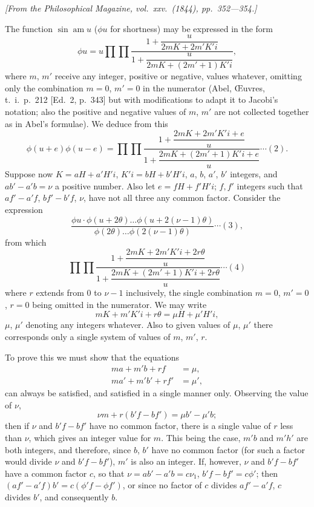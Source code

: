 \documentclass[12pt,a4paper]{article}
\begin{document}
\textit{[From the Philosophical Magazine, vol.~xxv.~(1844), pp.~352---354.]}

\bigskip
\setcounter{page}{120}

The function $\sin \operatorname{am} u$ ($\phi u$ for shortness) may be expressed in the form
\[
\phi u = u \prod \prod \frac{1 + \dfrac{u}{2mK + 2m'K'i}}{1 + \dfrac{u}{2mK + (2m'+1)K'i}},
\]
where $m$, $m'$ receive any integer, positive or negative, values whatever, omitting only
the combination $m = 0$, $m' = 0$ in the numerator (Abel, \OE uvres, t.~i.\ p.~212 [Ed.~2,
p.~343] but with modifications to adapt it to Jacobi's notation; also the positive and
negative values of $m$, $m'$ are not collected together as in Abel's formulae). We deduce
from this
\[
\phi(u+e)\phi(u-e) = \prod \prod \frac{1 + \dfrac{2mK + 2m'K'i + e}{u}}{1 + \dfrac{2mK + (2m'+1)K'i + e}{u}} \cdots (2).
\]
Suppose now $K = aH + a'H'i$, $K'i = bH + b'H'i$, $a$, $b$, $a'$, $b'$ integers, and $ab' - a'b = \nu$
a positive number. Also let $e = fH + f'H'i$; $f, f'$ integers such that $af' - a'f$, $bf' - b'f$, $\nu$,
have not all three any common factor. Consider the expression
\[
\frac{\phi u \cdot \phi(u + 2\theta) \ldots \phi(u + 2(\nu-1)\theta)}{\phi(2\theta) \ldots \phi(2(\nu-1)\theta)} \cdots (3),
\]
from which
\[
\prod \prod \frac{1 + \dfrac{2mK + 2m'K'i + 2r\theta}{u}}{1 + \dfrac{2mK + (2m'+1)K'i + 2r\theta}{u}} \cdots (4)
\]
where $r$ extends from $0$ to $\nu-1$ inclusively, the single combination $m = 0$, $m' = 0$, $r = 0$
being omitted in the numerator. We may write
\[
mK + m'K'i + r\theta = \mu H + \mu'H'i,
\]
$\mu$, $\mu'$ denoting any integers whatever. Also to given values of $\mu$, $\mu'$ there corresponds
only a single system of values of $m$, $m'$, $r$.

\newpage
\setcounter{page}{121}

To prove this we must show that the equations
\begin{align*}
ma + m'b + rf &= \mu,\\
ma' + m'b' + rf' &= \mu',
\end{align*}
can always be satisfied, and satisfied in a single manner only. Observing the value of $\nu$,
\[
\nu m + r(b'f - bf') = \mu b' - \mu'b;
\]
then if $\nu$ and $b'f - bf'$ have no common factor, there is a single value of $r$ less than $\nu$,
which gives an integer value for $m$. This being the case, $m'b$ and $m'h'$ are both
integers, and therefore, since $b$, $b'$ have no common factor (for such a factor would
divide $\nu$ and $b'f - bf'$), $m'$ is also an integer. If, however, $\nu$ and $b'f - bf'$ have a
common factor $c$, so that $\nu = ab' - a'b = c\nu_1$, $b'f - bf' = c\phi'$; then $(af' - a'f)b' = c(\phi'f - \phi f')$,
or since no factor of $c$ divides $af' - a'f$, $c$ divides $b'$, and consequently $b$.
\end{document}
